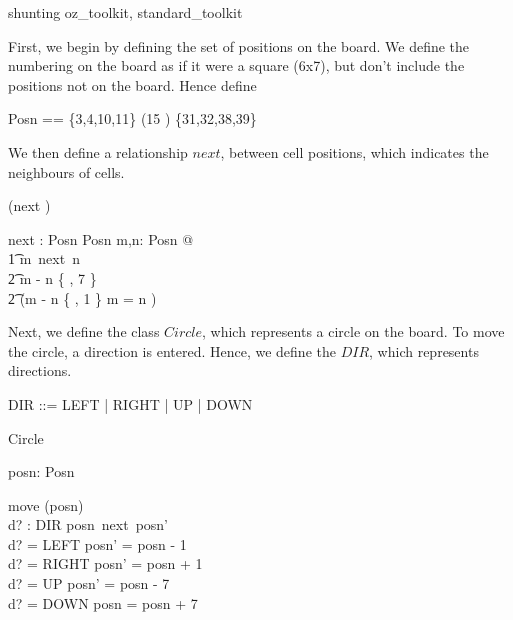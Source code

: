 \documentclass{article}
\begin{document}
\noindent

\begin{zsection}
  \SECTION shunting \parents oz\_toolkit, standard\_toolkit
\end{zsection}

First, we begin by defining the set of positions on the board. We define
the numbering on the board as if it were a square (6x7), but don't include
the positions not on the board. Hence define
\begin{zed}
  Posn == \{3,4,10,11\} \cup (15 ) \cup \{31,32,38,39\}
\end{zed}

We then define a relationship $next$, between cell positions, which
indicates the neighbours of cells.
\begin{zed}
 \relation (\varg next \varg)
\end{zed}

\begin{axdef}
  \varg next \varg : Posn \rel Posn
\where
  \forall m,n: Posn @ \\
    \t1 m~next~n \iff \\
       \t2 m - n \in \{ , 7 \} \lor \\
       \t2 (m - n \in \{  , 1 \} \land m  = n )
\end{axdef}

Next, we define the class $Circle$, which represents a circle on the
board. To move the circle, a direction is entered. Hence, we define the
$DIR$, which represents directions.

\begin{zed}
  DIR ::= LEFT | RIGHT | UP | DOWN
\end{zed}

\begin{class}{Circle}
\also
\begin{state}
  posn: Posn
\end{state} \classbreak
\begin{op}{move}
  \Delta(posn) \\
  d? : DIR
\where
  posn~next~posn' \\
  d? = LEFT \implies posn' = posn - 1 \\
  d? = RIGHT \implies posn' = posn + 1 \\
  d? = UP \implies posn' = posn - 7 \\
  d? = DOWN \implies posn = posn + 7 \\
\end{op}
\end{class}
\end{document}
